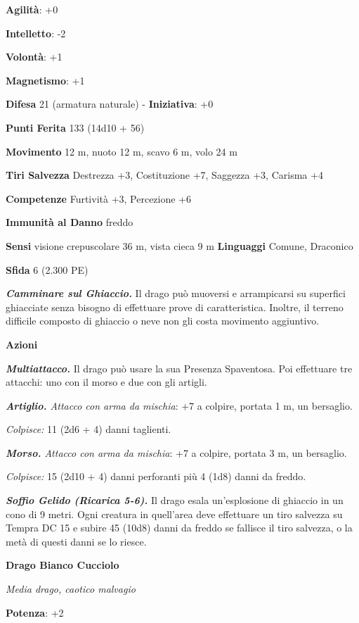 \begin{multicols}{2}
\textbf{Agilità}: +0

\textbf{Intelletto}: -2

\textbf{Volontà}: +1

\textbf{Magnetismo}: +1

\textbf{Difesa} 21 (armatura naturale) - \textbf{Iniziativa}: +0

\textbf{Punti Ferita} 133 (14d10 + 56)

\textbf{Movimento} 12 m, nuoto 12 m, scavo 6 m, volo 24 m

\textbf{Tiri Salvezza} Destrezza +3, Costituzione +7, Saggezza +3,
Carisma +4

\textbf{Competenze} Furtività +3, Percezione +6

\textbf{Immunità al Danno} freddo

\textbf{Sensi} visione crepuscolare 36 m, vista cieca 9 m
\textbf{Linguaggi} Comune, Draconico

\textbf{Sfida} 6 (2.300 PE)\smallskip

\emph{\textbf{Camminare sul Ghiaccio.}} Il drago può muoversi e
arrampicarsi su superfici ghiacciate senza bisogno di effettuare prove
di caratteristica. Inoltre, il terreno difficile composto di ghiaccio o
neve non gli costa movimento aggiuntivo.

\smallskip\textbf{Azioni}

\emph{\textbf{Multiattacco.}} Il drago può usare la sua Presenza
Spaventosa. Poi effettuare tre attacchi: uno con il morso e due con gli
artigli.

\emph{\textbf{Artiglio.} Attacco con arma da mischia}: +7 a colpire,
portata 1 m, un bersaglio.

\emph{Colpisce:} 11 (2d6 + 4) danni taglienti.

\emph{\textbf{Morso.} Attacco con arma da mischia}: +7 a colpire,
portata 3 m, un bersaglio.

\emph{Colpisce:} 15 (2d10 + 4) danni perforanti più 4 (1d8) danni da
freddo.

\emph{\textbf{Soffio Gelido (Ricarica 5-6).}} Il drago esala
un'esplosione di ghiaccio in un cono di 9 metri. Ogni creatura in
quell'area deve effettuare un tiro salvezza su Tempra DC 15 e
subire 45 (10d8) danni da freddo se fallisce il tiro salvezza, o la metà
di questi danni se lo riesce.

\textbf{Drago Bianco Cucciolo}

\emph{Media drago, caotico malvagio}

\textbf{Potenza}: +2


\end{multicols}
